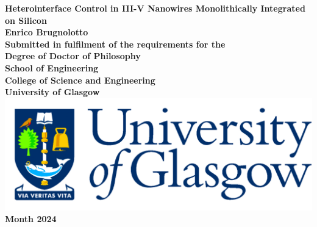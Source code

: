 \documentclass[12pt,titlepage,oneside]{book} %
\begin{document}
\begin{titlepage}
\centering
\vspace*{3cm}  %
\bfseries\Large
Heterointerface Control in III-V Nanowires Monolithically Integrated on Silicon\\
\vspace{3cm}
\normalfont\large
Enrico Brugnolotto\\
\vspace{2cm}
Submitted in fulfilment of the requirements for the\\
Degree of Doctor of Philosophy\\
\vspace{2cm}
School of Engineering\\
College of Science and Engineering\\
University of Glasgow\\
\vspace{1cm}
\includegraphics[scale=0.125]{GlaLogo.pdf}
\\
\vspace{1cm}
Month 2024
\end{titlepage}
\frontmatter  %
% 
\tableofcontents
\listoftables
\listoffigures
\printglossaries
% 
% 

\mainmatter %

% 
% 
% 

% 
% 

\appendix
% 
% 

\backmatter  %

\printbibliography
\end{document}
